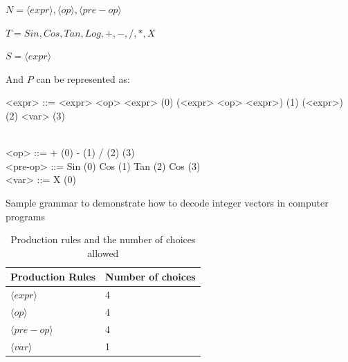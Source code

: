 \documentclass[conference]{IEEEtran}
\begin{document}
\begin{center}
	
	$ N = {\langle expr \rangle, \langle op \rangle, \langle pre-op \rangle}$
	
	$ T = {Sin,Cos,Tan,Log,+,-,/,*,X} $
	
	$ S = \langle expr \rangle $
	
\end{center}

\noindent
And $P$ can be represented as:

\begin{Grammar}
	\begin{grammar}
		
		
		<expr> ::=  <expr> <op> <expr> \hspace{2cm} (0) 
		\alt (<expr> <op> <expr>)  \hspace{1.75cm}  (1)  
		\alt <pre-op> (<expr>) \hspace{2.2cm}  (2)  \hspace{3.9cm} (3) \\\
		
		<op> ::=  + \hspace{4.4cm} (0)   \alt - \hspace{4.5cm}  (1)  \alt  /  \hspace{4.51cm}  (2) \alt * \hspace{4.45cm}  (3) \\
		
		<pre-op> ::= Sin \hspace{4.2cm} (0) \alt Cos
	\hspace{4.12cm} (1) \alt Tan  \hspace{4.13cm} (2) \alt Cos \hspace{4.12cm} (3) \\
		
		<var> ::= X  \hspace{4.4cm} (0)
		
		
	\end{grammar}
	
	\caption{Sample grammar to demonstrate how to decode integer vectors in computer programs}
	\label{gram:gramatica}
\end{Grammar}


\begin{table}[htb]
	\centering
	\caption{Production rules and the number of choices allowed}
	\label{tab:productionRules}
	\begin{tabular}{|l|l|}
		\hline
		Production Rules & Number of choices \\ \hline
		$\langle expr \rangle$                        & 4       \\ \hline
		$\langle op \rangle$                         & 4       \\ \hline
		$\langle pre-op \rangle$                         & 4       \\ \hline
		$\langle var \rangle$                          & 1       \\ \hline
	\end{tabular}
\end{table}
\end{document}

